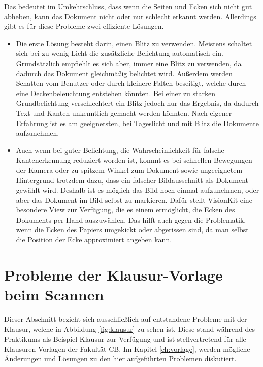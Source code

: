 \documentclass[nomenclature, oneside, 150]{HSMW-Thesis}
\begin{document}
		Das bedeutet im Umkehrschluss, dass wenn die Seiten und Ecken sich nicht gut abheben, kann das Dokument nicht oder nur schlecht erkannt werden. Allerdings gibt es für diese Probleme zwei effiziente Lösungen. 
		\begin{itemize}
			\item Die erste Lösung besteht darin, einen Blitz zu verwenden. Meistens schaltet sich bei zu wenig Licht die zusätzliche Belichtung automatisch ein. Grundsätzlich empfiehlt es sich aber, immer eine Blitz zu verwenden, da dadurch das Dokument gleichmäßig belichtet wird. Außerdem werden Schatten vom Benutzer oder durch kleinere Falten beseitigt, welche durch eine Deckenbeleuchtung entstehen könnten. Bei einer zu starken Grundbelichtung verschlechtert ein Blitz jedoch nur das Ergebnis, da dadurch Text und Kanten unkenntlich gemacht werden könnten. Nach eigener Erfahrung ist es am geeignetsten, bei Tageslicht und mit Blitz die Dokumente aufzunehmen. 
			\item Auch wenn bei guter Belichtung, die Wahrscheinlichkeit für falsche Kantenerkennung reduziert worden ist, kommt es bei schnellen Bewegungen der Kamera oder zu spitzem Winkel zum Dokument sowie ungeeignetem Hintergrund trotzdem dazu, dass ein falscher Bildausschnitt als Dokument gewählt wird. Deshalb ist es möglich das Bild noch einmal aufzunehmen, oder aber das Dokument im Bild selbst zu markieren. Dafür stellt VisionKit eine besondere View zur Verfügung, die es einem ermöglicht, die Ecken des Dokuments per Hand auszuwählen. Das hilft auch gegen die Problematik, wenn die Ecken des Papiers umgekickt oder abgerissen sind, da man selbst die Position der Ecke approximiert angeben kann. 
		\end{itemize}
		
	\section{Probleme der Klausur-Vorlage beim Scannen}\label{sc:problemevorlage}
		Dieser Abschnitt bezieht sich ausschließlich auf entstandene Probleme mit der Klausur, welche in Abbildung \ref{fig:klausur} zu sehen ist. Diese stand während des Praktikums als Beispiel-Klausur zur Verfügung und ist stellvertretend für alle Klausuren-Vorlagen der Fakultät CB. Im Kapitel \ref{ch:vorlage}, werden mögliche Änderungen und Lösungen zu den hier aufgeführten Problemen diskutiert.
		
\end{document}
